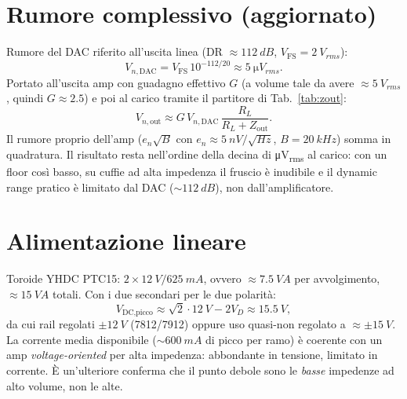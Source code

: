 \section{Rumore complessivo (aggiornato)}
Rumore del DAC riferito all'uscita linea (DR $\approx\SI{112}{dB}$,
$V_{\mathrm{FS}}=\SI{2}{V_{rms}}$):
\begin{equation}
  V_{n,\text{DAC}}=V_{\mathrm{FS}}\,10^{-112/20}\approx\SI{5}{\micro V_{rms}}.
\end{equation}
Portato all'uscita amp con guadagno effettivo $G$ (a volume tale da avere
$\approx\SI{5}{V_{rms}}$, quindi $G\approx2.5$) e poi al carico tramite il
partitore di Tab.~\ref{tab:zout}:
\begin{equation}
  V_{n,\text{out}}\approx G\,V_{n,\text{DAC}}\,\frac{R_L}{R_L+Z_{\text{out}}}.
\end{equation}
Il rumore proprio dell'amp ($e_n\sqrt{B}$ con
$e_n\approx\SI{5}{nV/\sqrt{Hz}}$, $B=\SI{20}{kHz}$) somma in quadratura.
Il risultato resta nell'ordine della decina di \si{\micro V_{rms}} al
carico: con un floor così basso, su cuffie ad alta impedenza il fruscio è
inudibile e il dynamic range pratico è limitato dal DAC ($\sim\SI{112}{dB}$),
non dall'amplificatore.

\section{Alimentazione lineare}
Toroide YHDC PTC15: $2\times\SI{12}{V}/\SI{625}{mA}$, ovvero
$\approx\SI{7.5}{VA}$ per avvolgimento, $\approx\SI{15}{VA}$ totali. Con i
due secondari per le due polarità:
\begin{equation}
  V_{\text{DC,picco}}\approx\sqrt2\cdot\SI{12}{V}-2V_{\!D}\approx\SI{15.5}{V},
\end{equation}
da cui rail regolati $\pm\SI{12}{V}$ (7812/7912) oppure uso quasi-non
regolato a $\approx\pm\SI{15}{V}$. La corrente media disponibile
($\sim\SI{600}{mA}$ di picco per ramo) è coerente con un amp
\emph{voltage-oriented} per alta impedenza: abbondante in tensione,
limitato in corrente. È un'ulteriore conferma che il punto debole sono le
\emph{basse} impedenze ad alto volume, non le alte.

